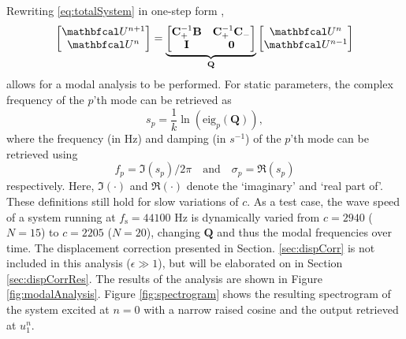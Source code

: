 Rewriting \eqref{eq:totalSystem} in one-step form \cite{bilbao2009}, 
\begin{equation}\label{eq:oneStepForm}
    \begin{bmatrix}
        \U^{n+1}\\
        \U^n
    \end{bmatrix} = 
    \underbrace{\begin{bmatrix}
        \mathbf{C}_+^{-1}\mathbf{B} & \mathbf{C}_+^{-1}\mathbf{C}_-\\
        \mathbf{I} & \mathbf{0}
    \end{bmatrix}}_{\mathbf{Q}}
    \begin{bmatrix}
        \U^n\\
        \U^{n-1}
    \end{bmatrix}
\end{equation}
allows for a modal analysis to be performed. For static parameters, the complex frequency of the $p$'th mode can be retrieved as
\begin{equation}\label{eq:modalAnalysis}
    s_p = \frac{1}{k}\ln \left(\text{eig}_p(\mathbf{Q})\right),
\end{equation}
where the frequency (in Hz) and damping (in $s^{-1}$) of the $p$'th mode can be retrieved using 
\begin{equation}
    f_p = \mathfrak{I}(s_p)/2\pi \quad \text{and} \quad \sigma_p = \mathfrak{R}(s_p)
\end{equation}
respectively. Here, $\mathfrak{I}(\cdot)$ and $\mathfrak{R}(\cdot)$ denote the `imaginary' and `real part of'. These definitions still hold for slow variations of $c$. As a test case, the wave speed of a system running at $f_\text{s} = 44100$ Hz is dynamically varied from $c = 2940$ ($N = 15$) to $c = 2205$ ($N = 20$), changing $\mathbf{Q}$ and thus the modal frequencies over time. The displacement correction presented in Section. \ref{sec:dispCorr} is not included in this analysis ($\epsilon \gg 1$), but will be elaborated on in Section \ref{sec:dispCorrRes}. The results of the analysis are shown in Figure \ref{fig:modalAnalysis}. Figure \ref{fig:spectrogram} shows the resulting spectrogram of the system excited at $n=0$ with a narrow raised cosine and the output retrieved at $u_1^n$.

